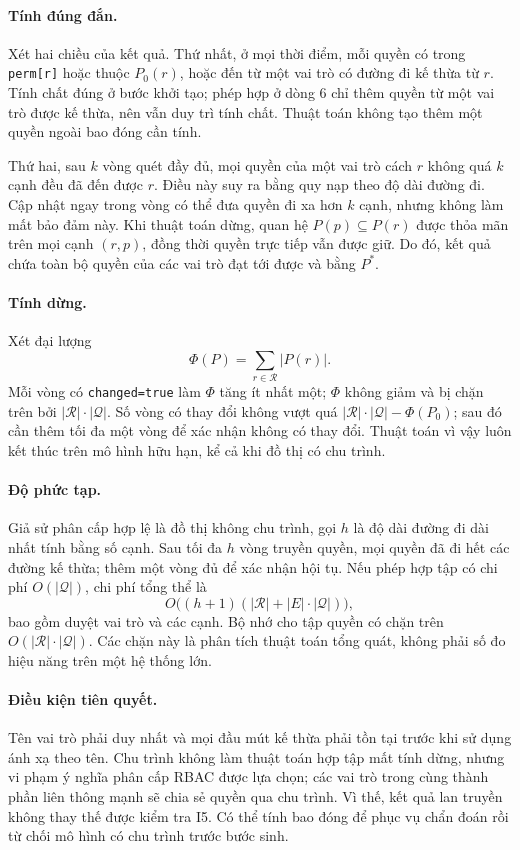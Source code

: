 \paragraph{Tính đúng đắn.}
Xét hai chiều của kết quả. Thứ nhất, ở mọi thời điểm, mỗi quyền có trong \texttt{perm[r]} hoặc thuộc $P_0(r)$, hoặc đến từ một vai trò có đường đi kế thừa từ $r$. Tính chất đúng ở bước khởi tạo; phép hợp ở dòng 6 chỉ thêm quyền từ một vai trò được kế thừa, nên vẫn duy trì tính chất. Thuật toán không tạo thêm một quyền ngoài bao đóng cần tính.

Thứ hai, sau $k$ vòng quét đầy đủ, mọi quyền của một vai trò cách $r$ không quá $k$ cạnh đều đã đến được $r$. Điều này suy ra bằng quy nạp theo độ dài đường đi. Cập nhật ngay trong vòng có thể đưa quyền đi xa hơn $k$ cạnh, nhưng không làm mất bảo đảm này. Khi thuật toán dừng, quan hệ $P(p)\subseteq P(r)$ được thỏa mãn trên mọi cạnh $(r,p)$, đồng thời quyền trực tiếp vẫn được giữ. Do đó, kết quả chứa toàn bộ quyền của các vai trò đạt tới được và bằng $P^{*}$.

\paragraph{Tính dừng.}
Xét đại lượng
\[
\Phi(P)=\sum_{r\in\mathcal{R}}|P(r)|.
\]
Mỗi vòng có \texttt{changed=true} làm $\Phi$ tăng ít nhất một; $\Phi$ không giảm và bị chặn trên bởi $|\mathcal{R}|\cdot|\mathcal{Q}|$. Số vòng có thay đổi không vượt quá $|\mathcal{R}|\cdot|\mathcal{Q}|-\Phi(P_0)$; sau đó cần thêm tối đa một vòng để xác nhận không có thay đổi. Thuật toán vì vậy luôn kết thúc trên mô hình hữu hạn, kể cả khi đồ thị có chu trình.

\paragraph{Độ phức tạp.}
Giả sử phân cấp hợp lệ là đồ thị không chu trình, gọi $h$ là độ dài đường đi dài nhất tính bằng số cạnh. Sau tối đa $h$ vòng truyền quyền, mọi quyền đã đi hết các đường kế thừa; thêm một vòng đủ để xác nhận hội tụ. Nếu phép hợp tập có chi phí $O(|\mathcal{Q}|)$, chi phí tổng thể là
\[
O\bigl((h+1)(|\mathcal{R}|+|E|\cdot|\mathcal{Q}|)\bigr),
\]
bao gồm duyệt vai trò và các cạnh. Bộ nhớ cho tập quyền có chặn trên $O(|\mathcal{R}|\cdot|\mathcal{Q}|)$. Các chặn này là phân tích thuật toán tổng quát, không phải số đo hiệu năng trên một hệ thống lớn.

\paragraph{Điều kiện tiên quyết.}
Tên vai trò phải duy nhất và mọi đầu mút kế thừa phải tồn tại trước khi sử dụng ánh xạ theo tên. Chu trình không làm thuật toán hợp tập mất tính dừng, nhưng vi phạm ý nghĩa phân cấp RBAC được lựa chọn; các vai trò trong cùng thành phần liên thông mạnh sẽ chia sẻ quyền qua chu trình. Vì thế, kết quả lan truyền không thay thế được kiểm tra I5. Có thể tính bao đóng để phục vụ chẩn đoán rồi từ chối mô hình có chu trình trước bước sinh.

